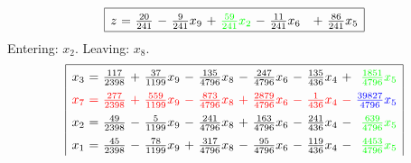 \documentclass[11pt]{article}
\begin{document}
\begin{equation*}
\begin{array}{|rcrcrcrcrcrcr|}
\hline
z \mspace{-6mu}&\mspace{-6mu} = \mspace{-6mu}&\mspace{-6mu} \frac{20}{241} \mspace{-6mu}&\mspace{-6mu} - \mspace{-6mu}&\mspace{-6mu} \frac{9}{241} x_{9} \mspace{-6mu}&\mspace{-6mu} + \mspace{-6mu}&\color{green}\mspace{-6mu} \frac{59}{241} x_{2} \mspace{-6mu}&\mspace{-6mu} - \mspace{-6mu}&\mspace{-6mu} \frac{11}{241} x_{6} \mspace{-6mu}&\mspace{-6mu}  \mspace{-6mu}&\mspace{-6mu}  \mspace{-6mu}&\mspace{-6mu} + \mspace{-6mu}&\mspace{-6mu} \frac{86}{241} x_{5}\\
\hline
\end{array}
\end{equation*}
Entering: $x_{2}$. Leaving: $x_{8}$. 
\begin{equation*}
\renewcommand{\arraystretch}{1.5} %
\begin{array}{|rcrcrcrcrcrcr|}
\hline
x_{3} \mspace{-6mu}&\mspace{-6mu} = \mspace{-6mu}&\mspace{-6mu} \frac{117}{2398} \mspace{-6mu}&\mspace{-6mu} + \mspace{-6mu}&\mspace{-6mu} \frac{37}{1199} x_{9} \mspace{-6mu}&\mspace{-6mu} - \mspace{-6mu}&\mspace{-6mu} \frac{135}{4796} x_{8} \mspace{-6mu}&\mspace{-6mu} - \mspace{-6mu}&\mspace{-6mu} \frac{247}{4796} x_{6} \mspace{-6mu}&\mspace{-6mu} - \mspace{-6mu}&\mspace{-6mu} \frac{135}{436} x_{4} \mspace{-6mu}&\mspace{-6mu} + \mspace{-6mu}&\color{green}\mspace{-6mu} \frac{1851}{4796} x_{5}\\
\color{red}x_{7} \mspace{-6mu}&\color{red}\mspace{-6mu} = \mspace{-6mu}&\color{red}\mspace{-6mu} \frac{277}{2398} \mspace{-6mu}&\color{red}\mspace{-6mu} + \mspace{-6mu}&\color{red}\mspace{-6mu} \frac{559}{1199} x_{9} \mspace{-6mu}&\color{red}\mspace{-6mu} - \mspace{-6mu}&\color{red}\mspace{-6mu} \frac{873}{4796} x_{8} \mspace{-6mu}&\color{red}\mspace{-6mu} + \mspace{-6mu}&\color{red}\mspace{-6mu} \frac{2879}{4796} x_{6} \mspace{-6mu}&\color{red}\mspace{-6mu} - \mspace{-6mu}&\color{red}\mspace{-6mu} \frac{1}{436} x_{4} \mspace{-6mu}&\color{red}\mspace{-6mu} - \mspace{-6mu}&\color{blue}\mspace{-6mu} \frac{39827}{4796} x_{5}\\
x_{2} \mspace{-6mu}&\mspace{-6mu} = \mspace{-6mu}&\mspace{-6mu} \frac{49}{2398} \mspace{-6mu}&\mspace{-6mu} - \mspace{-6mu}&\mspace{-6mu} \frac{5}{1199} x_{9} \mspace{-6mu}&\mspace{-6mu} - \mspace{-6mu}&\mspace{-6mu} \frac{241}{4796} x_{8} \mspace{-6mu}&\mspace{-6mu} + \mspace{-6mu}&\mspace{-6mu} \frac{163}{4796} x_{6} \mspace{-6mu}&\mspace{-6mu} - \mspace{-6mu}&\mspace{-6mu} \frac{241}{436} x_{4} \mspace{-6mu}&\mspace{-6mu} - \mspace{-6mu}&\color{green}\mspace{-6mu} \frac{639}{4796} x_{5}\\
x_{1} \mspace{-6mu}&\mspace{-6mu} = \mspace{-6mu}&\mspace{-6mu} \frac{45}{2398} \mspace{-6mu}&\mspace{-6mu} - \mspace{-6mu}&\mspace{-6mu} \frac{78}{1199} x_{9} \mspace{-6mu}&\mspace{-6mu} + \mspace{-6mu}&\mspace{-6mu} \frac{317}{4796} x_{8} \mspace{-6mu}&\mspace{-6mu} - \mspace{-6mu}&\mspace{-6mu} \frac{95}{4796} x_{6} \mspace{-6mu}&\mspace{-6mu} - \mspace{-6mu}&\mspace{-6mu} \frac{119}{436} x_{4} \mspace{-6mu}&\mspace{-6mu} - \mspace{-6mu}&\color{green}\mspace{-6mu} \frac{4453}{4796} x_{5}\\

\end{array}
\end{equation*}
\end{document}
